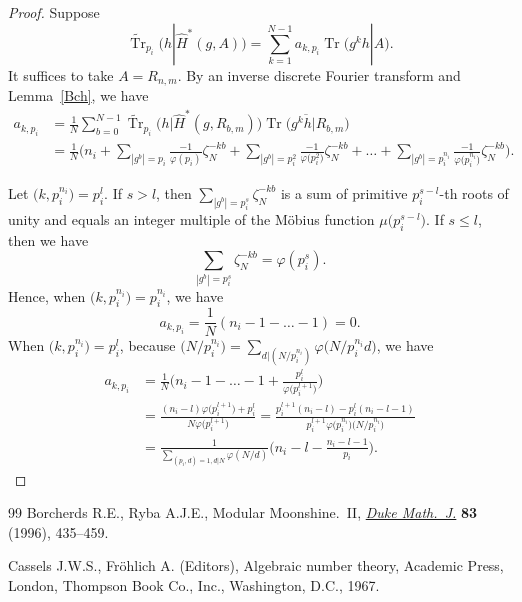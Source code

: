 \documentclass[11pt]{article}
\numberwithin{equation}{section}
\numberwithin{equation}{section}
\begin{document}
\begin{proof}
Suppose
\[
\widetilde{\operatorname{Tr}}_{p_i}\big(h|\hat{H}^*(g,A)\big)=\sum_{k=1}^{N-1}a_{k,p_i}\operatorname{Tr}\big(g^kh|A\big). \]
It suffices to take $A=R_{n,m}$.
By an inverse discrete Fourier transform and Lemma~\ref{Bch}, we have
\begin{align*}
a_{k,p_i}&=\frac{1}{N}\sum_{b=0}^{N-1}\widetilde{\operatorname{Tr}}_{p_i}\big(h|\hat{H}^*(g,R_{b,m})\big)\overline{\operatorname{Tr}\big(g^kh|R_{b,m}\big)} \\
 &=\frac{1}{N}\Bigg(n_i+\sum_{|g^b|=p_i} \frac{-1}{\varphi (p_i)}\zeta_N^{-kb}+\sum_{ |g^b|=p_i^2} \frac{-1}{\varphi \big(p_i^2\big)}\zeta_N^{-kb}+\dots+\sum_{|g^b|=p_i^{n_i}} \frac{-1}{\varphi \big(p_i^{n_i}\big)}\zeta_N^{-kb}\Bigg).
\end{align*}

Let $\big(k,p_i^{n_i}\big)=p_i^l$. If $s>l$, then $\sum_{|g^b|=p_i^s}\zeta_N^{-kb}$ is a sum of primitive $p_i^{s-l}$-th roots of unity and equals an integer multiple of the M\"obius function $\mu\big(p_i^{s-l}\big)$. If $s\leq l$, then we have
\[
\sum_{|g^b|=p_i^s}\zeta_N^{-kb}=\varphi(p_i^s).
\]
Hence, when $\big(k,p_i^{n_i}\big)=p_i^{n_i}$, we have 
\[ a_{k,p_i}=\frac{1}{N}(n_i-1-\dots-1)=0.\]
When $\big(k,p_i^{n_i}\big)=p_i^{l}$, because $\big(N/p_i^{n_i}\big)=\sum_{d|(N/p_i^{n_i})}\varphi\big(N/p_i^{n_i}d\big)$, we have
\begin{align*}
a_{k,p_i}&=\frac{1}{N}\Bigg(n_i-1-\dots-1+\frac{p_i^l}{\varphi \big(p_i^{l+1}\big)}\Bigg)\\
 &=\frac{(n_i-l)\varphi \big(p_i^{l+1}\big)+p_i^l}{N\varphi \big(p_i^{l+1}\big)} =\frac{p_i^{l+1}(n_i-l)-p_i^l(n_i-l-1)}{p_i^{l+1}\varphi\big(p_i^{n_i}\big)\big(N/p_i^{n_i}\big)}\\
 &=\frac{1}{\sum_{(p_i,d)=1,d|N}\varphi (N/d)}\bigg(n_i-l-\frac{n_i-l-1}{p_i}\bigg).\tag*{\qed}
\end{align*}\renewcommand{\qed}{}
\end{proof}
\begin{thebibliography}{99}
Borcherds R.E., Ryba A.J.E., Modular {M}oonshine.~{II}, \href{https://doi.org/10.1215/S0012-7094-96-08315-5}{\textit{Duke Math.~J.}}
 \textbf{83} (1996), 435--459.

Cassels J.W.S., Fr\"ohlich A. (Editors), Algebraic number theory, Academic
 Press, London, Thompson Book Co., Inc., Washington, D.C., 1967.

\end{thebibliography}
\end{document}
